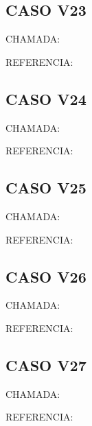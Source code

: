 \documentclass{undftex}
\begin{document}
\begin{refsection}\section*{CASO V23}\noindent CHAMADA:  \par\noindent REFERENCIA:\par\printbibliography[heading=none,check=undfconsultadas]\end{refsection}\clearpage
\begin{refsection}\section*{CASO V24}\noindent CHAMADA:  \par\noindent REFERENCIA:\par\printbibliography[heading=none,check=undfconsultadas]\end{refsection}\clearpage
\begin{refsection}\section*{CASO V25}\noindent CHAMADA:  \par\noindent REFERENCIA:\par\printbibliography[heading=none,check=undfconsultadas]\end{refsection}\clearpage
\begin{refsection}\section*{CASO V26}\noindent CHAMADA:  \par\noindent REFERENCIA:\par\printbibliography[heading=none,check=undfconsultadas]\end{refsection}\clearpage
\begin{refsection}\section*{CASO V27}\noindent CHAMADA:  \par\noindent REFERENCIA:\par\printbibliography[heading=none,check=undfconsultadas]\end{refsection}\clearpage
\end{document}
